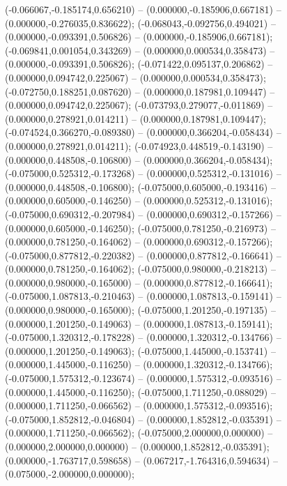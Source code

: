  (-0.066067,-0.185174,0.656210) -- (0.000000,-0.185906,0.667181) -- (0.000000,-0.276035,0.836622);
 (-0.068043,-0.092756,0.494021) -- (0.000000,-0.093391,0.506826) -- (0.000000,-0.185906,0.667181);
 (-0.069841,0.001054,0.343269) -- (0.000000,0.000534,0.358473) -- (0.000000,-0.093391,0.506826);
 (-0.071422,0.095137,0.206862) -- (0.000000,0.094742,0.225067) -- (0.000000,0.000534,0.358473);
 (-0.072750,0.188251,0.087620) -- (0.000000,0.187981,0.109447) -- (0.000000,0.094742,0.225067);
 (-0.073793,0.279077,-0.011869) -- (0.000000,0.278921,0.014211) -- (0.000000,0.187981,0.109447);
 (-0.074524,0.366270,-0.089380) -- (0.000000,0.366204,-0.058434) -- (0.000000,0.278921,0.014211);
 (-0.074923,0.448519,-0.143190) -- (0.000000,0.448508,-0.106800) -- (0.000000,0.366204,-0.058434);
 (-0.075000,0.525312,-0.173268) -- (0.000000,0.525312,-0.131016) -- (0.000000,0.448508,-0.106800);
 (-0.075000,0.605000,-0.193416) -- (0.000000,0.605000,-0.146250) -- (0.000000,0.525312,-0.131016);
 (-0.075000,0.690312,-0.207984) -- (0.000000,0.690312,-0.157266) -- (0.000000,0.605000,-0.146250);
 (-0.075000,0.781250,-0.216973) -- (0.000000,0.781250,-0.164062) -- (0.000000,0.690312,-0.157266);
 (-0.075000,0.877812,-0.220382) -- (0.000000,0.877812,-0.166641) -- (0.000000,0.781250,-0.164062);
 (-0.075000,0.980000,-0.218213) -- (0.000000,0.980000,-0.165000) -- (0.000000,0.877812,-0.166641);
 (-0.075000,1.087813,-0.210463) -- (0.000000,1.087813,-0.159141) -- (0.000000,0.980000,-0.165000);
 (-0.075000,1.201250,-0.197135) -- (0.000000,1.201250,-0.149063) -- (0.000000,1.087813,-0.159141);
 (-0.075000,1.320312,-0.178228) -- (0.000000,1.320312,-0.134766) -- (0.000000,1.201250,-0.149063);
 (-0.075000,1.445000,-0.153741) -- (0.000000,1.445000,-0.116250) -- (0.000000,1.320312,-0.134766);
 (-0.075000,1.575312,-0.123674) -- (0.000000,1.575312,-0.093516) -- (0.000000,1.445000,-0.116250);
 (-0.075000,1.711250,-0.088029) -- (0.000000,1.711250,-0.066562) -- (0.000000,1.575312,-0.093516);
 (-0.075000,1.852812,-0.046804) -- (0.000000,1.852812,-0.035391) -- (0.000000,1.711250,-0.066562);
 (-0.075000,2.000000,0.000000) -- (0.000000,2.000000,0.000000) -- (0.000000,1.852812,-0.035391);
 (0.000000,-1.763717,0.598658) -- (0.067217,-1.764316,0.594634) -- (0.075000,-2.000000,0.000000);

